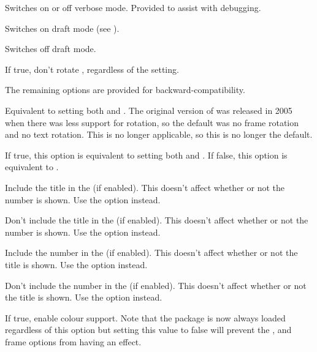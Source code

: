 \documentclass[fontsize=12pt]{scrbook}
\begin{document}
Switches on or off verbose mode. Provided to assist with debugging.

Switches on draft mode (see ).

Switches off draft mode.


If true, don't rotate , regardless of the
 setting.

The remaining options are provided for backward-compatibility.


Equivalent to setting both  and
.
The original version of  was released in 2005 when
there was less support for rotation, so the default was no frame
rotation and no  text rotation. This is no longer
applicable, so this is no longer the default.


If true, this option is equivalent to setting both
 and
.
If false, this option is equivalent to .


Include the title in the  (if enabled). This doesn't affect
whether or not the number is shown. Use the  option
instead.


Don't include the title in the  (if enabled). This doesn't affect
whether or not the number is shown. Use the  option
instead.


Include the number in the  (if enabled). This doesn't affect
whether or not the title is shown. Use the  option
instead.


Don't include the number in the  (if enabled). This doesn't affect
whether or not the title is shown. Use the  option
instead.


If true, enable colour support. Note that the  package is
now always loaded regardless of this option but setting this value
to false will prevent the , 
and  frame options from having an effect.
\end{document}
